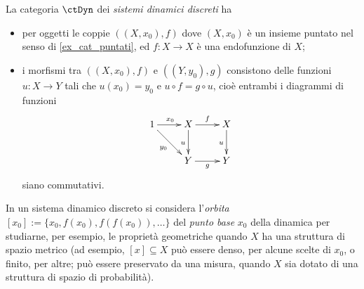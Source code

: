 \begin{example}\label{ex_cat_dyn}
	La categoria \(\ctDyn\) dei \emph{sistemi dinamici discreti} ha
	\begin{itemize}
		\item per oggetti le coppie \(((X,x_0),f)\) dove \((X,x_0)\) è un insieme puntato nel senso di \ref{ex_cat_puntati}, ed \(f : X\to X\) è una endofunzione di \(X\);
		\item  i morfismi tra \(((X,x_0),f)\) e \(((Y,y_0),g)\) consistono delle funzioni \(u : X \to Y\) tali che \(u(x_0)=y_0\) e \(u\circ f = g\circ u\), cioè entrambi i diagrammi di funzioni
		      \[\xymatrix{
				      1\ar[r]^{x_0}\ar[dr]_{y_0} & X\ar[r]^f\ar[d]_u & X \ar[d]_u\\
				      & Y \ar[r]_g & Y
			      }\]
		      siano commutativi.
	\end{itemize}
	In un sistema dinamico discreto si considera l'\emph{orbita} \([x_0]:=\{x_0,f(x_0),f(f(x_0)),\dots\}\) del \emph{punto base} \(x_0\) della dinamica per studiarne, per esempio, le proprietà geometriche quando \(X\) ha una struttura di spazio metrico (ad esempio, \([x]\subseteq X\) può essere denso, per alcune scelte di \(x_0\), o finito, per altre; può essere preservato da una misura, quando \(X\) sia dotato di una struttura di spazio di probabilità).
\end{example}
